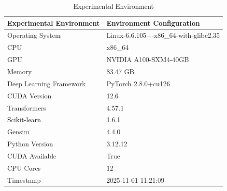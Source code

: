 \begin{table}
\caption{Experimental Environment}
\label{tab:env}
\begin{tabular}{ll}
\toprule
Experimental Environment & Environment Configuration \\
\midrule
Operating System & Linux-6.6.105+-x86_64-with-glibc2.35 \\
CPU & x86_64 \\
GPU & NVIDIA A100-SXM4-40GB \\
Memory & 83.47 GB \\
Deep Learning Framework & PyTorch 2.8.0+cu126 \\
CUDA Version & 12.6 \\
Transformers & 4.57.1 \\
Scikit-learn & 1.6.1 \\
Gensim & 4.4.0 \\
Python Version & 3.12.12 \\
CUDA Available & True \\
CPU Cores & 12 \\
Timestamp & 2025-11-01 11:21:09 \\
\bottomrule
\end{tabular}
\end{table}
